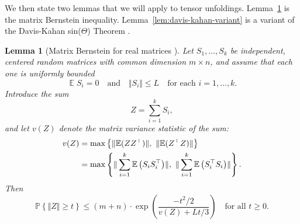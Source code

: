 \documentclass{article}
\newcommand{\Expect}{\operatorname{\mathbb{E}}}
\newcommand{\Prob}[1]{\mathbb{P}\left\{ #1 \right\}}
\newcommand{\norm}[1]{\Vert #1 \Vert}
\theoremstyle{plain}
\newtheorem{lemma}[theorem]{Lemma}
\begin{document}
We then state two lemmas that we will apply to tensor unfoldings.
Lemma~\ref{lem:mtx-bernstein} is the matrix Bernstein inequality.
Lemma~\ref{lem:davis-kahan-variant} is a variant of the Davis-Kahan sin($\Theta$) Theorem \cite{davis1970rotation}.

\begin{lemma}[Matrix Bernstein for real matrices {\cite[Theorem 1.6.2]{tropp2015introduction}}]
	\label{lem:mtx-bernstein}	
	Let $S_1, \ldots, S_k$ be independent, centered random matrices with common dimension $m \times n$,
	and assume that each one is uniformly bounded
	$$
	\Expect S_i = 0
	\quad\text{and}\quad
	\norm{S_i} \leq L
	\quad\text{for each $i = 1, \ldots, k$.}
	$$
	Introduce the sum
	\begin{equation} 
		Z = \sum_{i=1}^k S_i,
		\nonumber
	\end{equation}
	and let $v(Z)$ denote the matrix variance statistic of the sum:
	\begin{equation}
		\begin{aligned}
			v(Z) &= \max\big\{ \norm{ \smash{\Expect (Z Z^\top)} }, \ 
			\norm{ \smash{\Expect (Z^\top Z) } } \big\} \\
			&= \max\left\{ \norm{ \sum_{i=1}^k \Expect \big(S_i S_i^\top \big) }, \
			\norm{ \sum_{i=1}^k \Expect \big(S_i^\top S_i \big) } \right\}.
		\end{aligned}
		\nonumber
	\end{equation}
	Then
	\begin{equation}
		\Prob{ \norm{ Z } \geq t }
		\leq (m + n) \cdot \exp \left( \frac{-t^2/2}{v(Z) + Lt/3} \right)
		\quad\text{for all $t \geq 0$.}
		\nonumber
	\end{equation}
\end{lemma}
\end{document}
